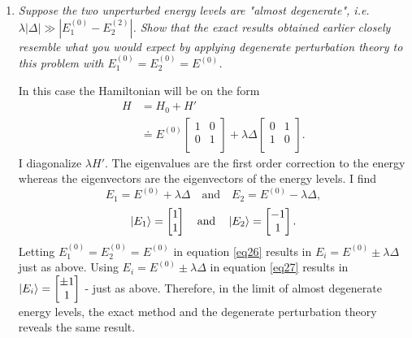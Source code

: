 \begin{example}
\begin{enumerate}
		\item \emph{Suppose the two unperturbed energy levels are "almost degenerate", i.e. $\lambda |\Delta|\gg |E_1^{(0)}-E_2^{(2)}|$. Show that the exact results obtained earlier closely resemble what you would expect by applying degenerate perturbation theory to this problem with $E_1^{(0)}=E_2^{(0)}=E^{(0)}$.}\newline
		
		In this case the Hamiltonian will be on the form
		\begin{equation}
			\begin{split}
				H&=H_0+H'\\
				&\doteq E^{(0)}\begin{bmatrix}
					1 & 0 \\
					0 & 1\\
				\end{bmatrix}+\lambda \Delta\begin{bmatrix}
					0 & 1 \\
					1 & 0\\
				\end{bmatrix}.
			\end{split}
		\end{equation} 
		I diagonalize $\lambda H'$. The eigenvalues are the first order correction to the energy whereas the eigenvectors are the eigenvectors of the energy levels. I find
		\begin{equation}
			E_1=E^{(0)}+\lambda\Delta \quad \mbox{and} \quad E_2=E^{(0)}-\lambda\Delta,
		\end{equation} 
		\begin{equation}
			\ket{E_1}=\begin{bmatrix}
				1 \\
				1 \\
			\end{bmatrix} \quad \mbox{and} \quad \ket{E_2}=\begin{bmatrix}
				-1 \\
				1 \\
			\end{bmatrix}.
		\end{equation} 
		Letting $E_1^{(0)}=E_2^{(0)}=E^{(0)}$ in equation \eqref{eq26} results in $E_i=E^{(0)}\pm\lambda\Delta$ just as above. Using $E_i=E^{(0)}\pm\lambda\Delta$ in equation \eqref{eq27} results in $\ket{E_i}=\begin{bmatrix}
			\pm1 \\
			1 \\
		\end{bmatrix}$ - just as above. Therefore, in the limit of almost degenerate energy levels, the exact method and the degenerate perturbation theory reveals the same result. 
		
	\end{enumerate}
\end{example}

